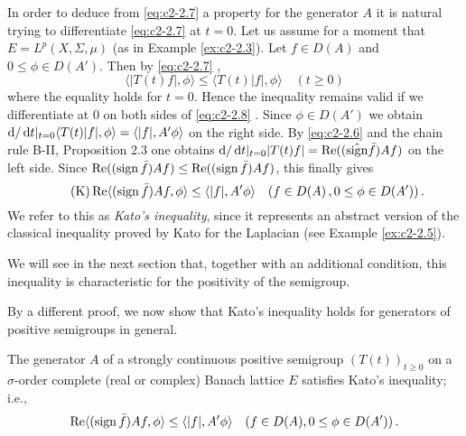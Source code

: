 In order to deduce from \ref{eq:c2-2.7} a property for the generator $A$ it is natural trying to differentiate \ref{eq:c2-2.7} at $t = 0$.
Let us assume for a moment that $E = L^p(X,\Sigma,\mu)$ (as in Example \ref{ex:c2-2.3}).
Let $f \in D(A)$ and $0 \leq \phi \in D(A')$.
Then by \ref{eq:c2-2.7}  ,
\begin{equation}\label{eq:c2-2.8}
\langle |T(t)f|,\phi \rangle \leq \langle T(t)|f|,\phi \rangle \quad (t \geq 0)
\end{equation}
where the equality holds for $t = 0$.
Hence the inequality remains valid if we differentiate at $0$ on both sides of \ref{eq:c2-2.8}  .
Since $\phi \in D(A')$ we obtain $\mathop{}\!\mathrm{d}{}/\mathop{}\!\mathrm{d}{t}|_{t=0} \langle T(t)|f|,\phi \rangle = \langle |f|,A'\phi \rangle$ on the right side.
By \ref{eq:c2-2.6} and the chain rule B-II, Proposition 2.3 
one obtains $\mathop{}\!\mathrm{d}{}/\mathop{}\!\mathrm{d}{t}|_{t=0}|T(t)f| = \mathop{}\!\mathrm{Re}((\hat{\operatorname{sign}} \bar{f})Af)$ on the left side.
Since $\mathop{}\!\mathrm{Re}((\operatorname{sign} \bar{f})Af) \leq \mathop{}\!\mathrm{Re}((\operatorname{sign} \bar{f})Af)$, this finally gives
\begin{equation*}\label{eq:c2-K} \tag{K}
\mathop{}\!\mathrm{Re}\langle(\operatorname{sign} \bar{f})Af,\phi \rangle \leq \langle |f|,A'\phi \rangle \quad (f \in D(A) \,, 0 \leq \phi \in D(A')) \,.
\end{equation*}
We refer to this as \emph{Kato's inequality}, since it represents an abstract version of the classical inequality proved by Kato for the Laplacian (see Example \ref{ex:c2-2.5}).

We will see in the next section that, together with an additional condition, this inequality is characteristic for the positivity of the semigroup.

By a different proof, we now show that Kato's inequality holds for generators of positive semigroups in general.

\begin{theorem}\label{thm:c2-2.4}
The generator $A$ of a strongly continuous positive semigroup $(T(t))_{t \geq 0}$ on a $\sigma$-order complete (real or complex) Banach lattice $E$ satisfies Kato's inequality; i.e.,
\begin{equation*}\label{eq:c2-K-2} %
\Re\langle(\sign \bar{f})Af,\phi \rangle \leq \langle |f|,A'\phi \rangle \quad (f \in D(A), 0 \leq \phi \in D(A')) \,.
\end{equation*}
\end{theorem}

